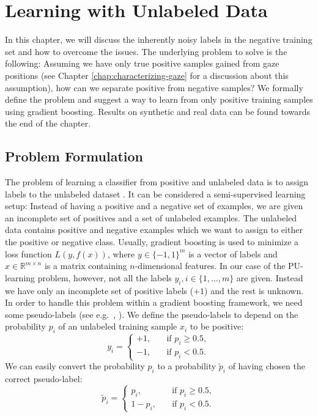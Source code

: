 \chapter{Learning with Unlabeled Data}
\label{chap:learning-with-unlabeled-data}
In this chapter, we will discuss the inherently noisy labels in the negative training set and how to overcome the issues. 
The underlying problem to solve is the following: Assuming we have only true positive samples gained from gaze positions (see Chapter \ref{chap:characterizing-gaze} for a discussion about this assumption), how can we separate positive from negative samples? We formally define the problem and suggest a way to learn from only positive training samples using gradient boosting. Results on synthetic and real data can be found towards the end of the chapter.

\section{Problem Formulation}
The problem of learning a classifier from positive and unlabeled data is to assign labels to the unlabeled dataset \cite{elkan2008learning}. 
It can be considered a semi-supervised learning setup: Instead of having a positive and a negative set of examples, we are given an incomplete set of positives and a set of unlabeled examples. 
The unlabeled data contains positive and negative examples which we want to assign to either the positive or negative class. 
Usually, gradient boosting is used to minimize a loss function $L(y,f(x))$, where $y \in \{-1,1\}^m$ is a vector of labels and $x \in \mathbb{R}^{m\times n}$ is a matrix containing $n$-dimensional features. In our case of the PU-learning problem, however, not all the labels $y_i, i \in \{1,\dots,m\}$ are given. 
Instead we have only an incomplete set of positive labels ($+1$) and the rest is unknown. In order to handle this problem within a gradient boosting framework, we need some pseudo-labels (see e.g.\ \cite{bennett2002exploiting}, \cite{mallapragada2009semiboost}). We define the pseudo-labels to depend on the probability $p_i$ of an unlabeled training sample $x_i$ to be positive:
\begin{equation*}
 y_i = 
    \begin{cases}
	+1, \quad & \text{if } p_i \geq 0.5, \\
	-1, \quad & \text{if } p_i < 0.5.
      \end{cases}
\end{equation*}
We can easily convert the probability $p_i$ to a probability $\tilde p_i$ of having chosen the correct pseudo-label:
\begin{equation*}
 \tilde p_i = 
    \begin{cases}
	p_i, \quad & \text{if } p_i \geq 0.5, \\
	1-p_i, \quad & \text{if } p_i < 0.5.
      \end{cases}
\end{equation*}

